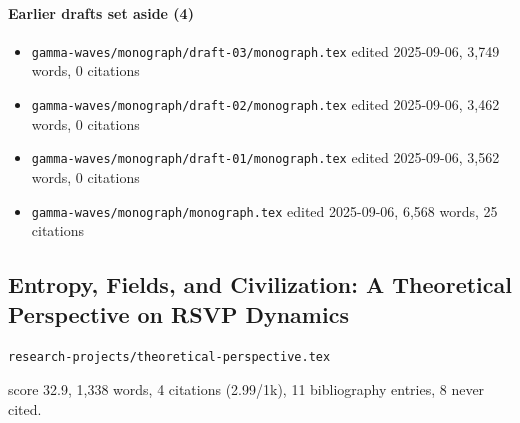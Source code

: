 \documentclass[11pt]{article}
\newcommand{\loc}[1]{{\small\color{muted}\texttt{#1}}}
\begin{document}
\paragraph{Earlier drafts set aside (4)}
\begin{itemize}
\item \loc{gamma-waves/\allowbreak{}monograph/\allowbreak{}draft-03/\allowbreak{}monograph.tex} edited 2025-09-06, 3,749 words, 0 citations
\item \loc{gamma-waves/\allowbreak{}monograph/\allowbreak{}draft-02/\allowbreak{}monograph.tex} edited 2025-09-06, 3,462 words, 0 citations
\item \loc{gamma-waves/\allowbreak{}monograph/\allowbreak{}draft-01/\allowbreak{}monograph.tex} edited 2025-09-06, 3,562 words, 0 citations
\item \loc{gamma-waves/\allowbreak{}monograph/\allowbreak{}monograph.tex} edited 2025-09-06, 6,568 words, 25 citations
\end{itemize}
\subsection{Entropy, Fields, and Civilization: A Theoretical Perspective on RSVP Dynamics}
\loc{research-projects/\allowbreak{}theoretical-perspective.tex}\par
score 32.9, 1,338 words, 4 citations (2.99/1k), 11 bibliography entries, 8 never cited.
\end{document}
